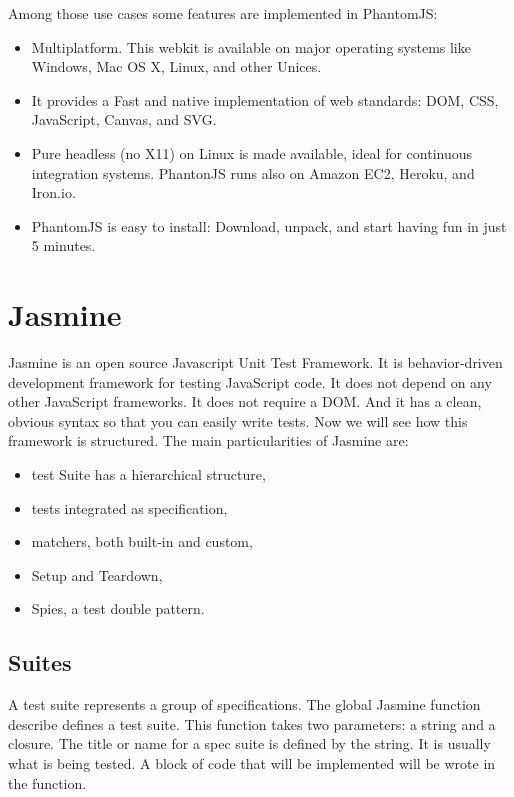 \documentclass[11pt]{article}
\begin{document}
Among those use cases some features are implemented in PhantomJS:

\begin{itemize}
\item Multiplatform. This webkit is available on major operating systems like Windows, Mac OS X, Linux, and other Unices.
\item It provides a Fast and native implementation of web standards: DOM, CSS, JavaScript, Canvas, and SVG.
\item Pure headless (no X11) on Linux is made available, ideal for continuous integration systems. PhantonJS runs also on Amazon EC2, Heroku, and Iron.io.
\item PhantomJS is easy to install: Download, unpack, and start having fun in just 5 minutes.
\end{itemize}

\section{Jasmine}

Jasmine is an open source Javascript Unit Test Framework. It is behavior-driven development framework for testing JavaScript code. It does not depend on any other JavaScript frameworks. It does not require a DOM. And it has a clean, obvious syntax so that you can easily write tests. Now we will see how this framework is structured. The main particularities of Jasmine are:

\begin{itemize}
\item test Suite has a hierarchical structure,
\item tests integrated as specification,
\item matchers, both built-in and custom,
\item Setup and Teardown,
\item Spies, a test double pattern.
\end{itemize}

\subsection{Suites}

A test suite represents a group of specifications. The global Jasmine function describe defines a test suite. This function takes two parameters: a string and a closure. The title or name for a spec suite is defined by the string. It is usually what is being tested. A block of code that will be implemented will be wrote in the function.
\end{document}
